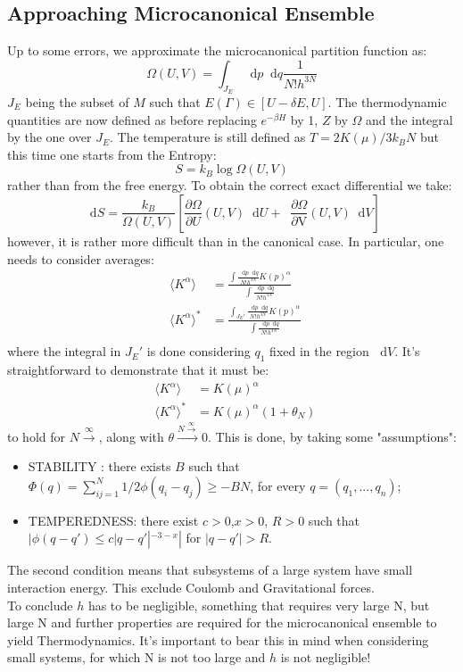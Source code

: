 \documentclass{article}
\newcommand*\diff{\mathop{}\!\mathrm{d}}
\newcommand*\mean[1]{\mathop{}\!\langle#1 \rangle }
\newcommand*\derV[1]{\mathop{}\!\frac{\partial #1}{\partial \mathrm{V}} }
\begin{document}
\subsection{Approaching Microcanonical Ensemble}
Up to some errors, we approximate the microcanonical partition function  as:
$$ \Omega(U,V) = \int_{J_E}  \diff{p}\diff{q} \frac{1}{N!h^{3N}}$$
$J_E$ being the subset of $M$ such that $E(\Gamma) \in [U-\delta E,U]$.
The thermodynamic quantities are now defined as before replacing $e^{-\beta H} $ by 1, $Z$ by $\Omega$ and the integral by the one over $J_E$. The temperature is still defined as $ T = 2 K(\mu)/ 3k_B N$ but this time one starts from the Entropy:
$$ S =k_B \log \Omega(U,V) $$
rather than from the free energy. To obtain the correct exact differential we take:
$$ \diff{S} = \frac{k_B}{\Omega(U,V)} [\frac{\partial \Omega}{\partial U}(U,V) \diff{U} +\derV{\Omega} (U,V) \diff{V}]$$
however, it is rather more difficult than in the canonical case. In particular, one needs to consider averages:
\begin{equation*}
    \begin{aligned}
    \mean{K^\alpha} &= \frac{\int \frac{\diff{p}\diff{q}}{N!h^{3N}} K(p)^\alpha}{\int \frac{\diff{p}\diff{q}}{N!h^{3N}}} \\
    \mean{K^\alpha}^* &= \frac{\int_{J_E'} \frac{\diff{p}\diff{q}}{N!h^{3N}} K(p)^\alpha}{\int \frac{\diff{p}\diff{q}}{N!h^{3N}}} \\
    \end{aligned}
\end{equation*}
where the integral in $J_E'$ is done considering $q_1$ fixed in the region $\diff{V}$. It's straightforward to demonstrate that it must be:
\begin{equation*}
    \begin{aligned}
    \mean{K^\alpha} &= K(\mu)^\alpha     \\
    \mean{K^\alpha}^* &= K(\mu)^\alpha (1+\theta_N) 
    \end{aligned}
\end{equation*}
to hold for $N\xrightarrow \infty$, along with $\theta \xrightarrow{N\xrightarrow \infty} 0$. This is done, by taking some "assumptions":
\begin{itemize}
    \item STABILITY : there exists $B$ such that $\Phi(q)= \sum_{ij = 1}^N 1/2 \phi(q_i-q_j) \geq - B N $, for every $q=(q_1,...,q_n)$;
    \item TEMPEREDNESS: there exist $c > 0$,$x> 0$, $R> 0$ such that $|\phi(q-q') \leq c|q-q'|^{-3-x}|$ for $|q-q'|> R$.
\end{itemize}
The second condition means that subsystems of a large system have small interaction energy. This exclude Coulomb and Gravitational forces.\\
To conclude $ h$ has to be negligible, something that requires very large N, but large N and further properties are required for  the microcanonical ensemble to yield Thermodynamics. It's important to bear this in mind when considering small systems, for which N is not too large and $h$ is not negligible!
\end{document}
